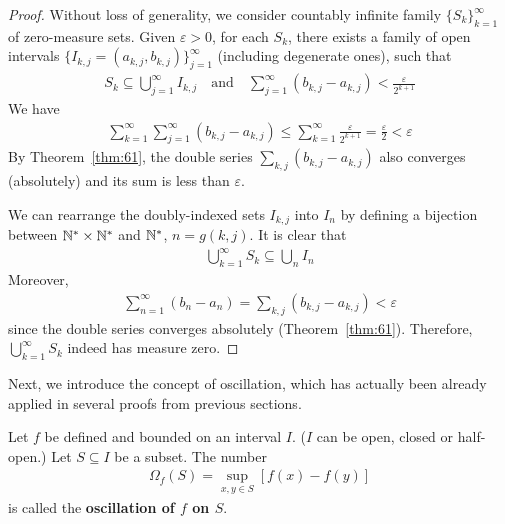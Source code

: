 \documentclass[thmcnt=section, 12pt]{my-elegantbook}
\begin{document}
\begin{proof}
    Without loss of generality,
    we consider countably infinite family
    $\{S_k\}_{k=1}^\infty$
    of zero-measure sets.
    Given $\varepsilon > 0$,
    for each $S_k$,
    there exists a family of open intervals
    $\{I_{k,j} = (a_{k,j}, b_{k,j})\}_{j=1}^\infty$
    (including degenerate ones),
    such that
    \begin{align*}
        S_k \subseteq \bigcup_{j=1}^\infty I_{k,j}
        \quad \text{and} \quad
        \sum_{j=1}^\infty (b_{k,j} - a_{k,j})
        < \frac{\varepsilon}{2^{k+1}}
    \end{align*}
    We have
    \begin{align*}
        \sum_{k=1}^\infty \sum_{j=1}^\infty
        (b_{k,j} - a_{k,j})
        \leq \sum_{k=1}^\infty \frac{\varepsilon}{2^{k+1}}
        = \frac{\varepsilon}{2}
        < \varepsilon
    \end{align*}
    By Theorem~\ref{thm:61},
    the double series $\sum_{k,j} (b_{k,j} - a_{k,j})$
    also converges (absolutely) and its sum is less than $\varepsilon$.

    We can rearrange the doubly-indexed sets $I_{k,j}$ into
    $I_n$ by defining a bijection between $\mathbb{N}^\ast \times \mathbb{N}^\ast$
    and $\mathbb{N}^\ast$, $n = g(k,j)$.
    It is clear that
    \begin{align*}
        \bigcup_{k=1}^\infty S_k
        \subseteq \bigcup_{n} I_{n}
    \end{align*}
    Moreover,
    \begin{align*}
        \sum_{n=1}^\infty (b_n - a_n)
        = \sum_{k,j} (b_{k,j} - a_{k,j})
        < \varepsilon
    \end{align*}
    since the double series converges absolutely (Theorem~\ref{thm:61}).
    Therefore, $\bigcup_{k=1}^\infty S_k$ indeed has measure zero.
\end{proof}


Next, we introduce the concept of oscillation,
which has actually been already applied
in several proofs from previous sections.

\begin{definition} \label{def:7}
    Let $f$ be defined and bounded on an interval $I$.
    ($I$ can be open, closed or half-open.)
    Let $S \subseteq I$ be a subset.
    The number
    \begin{align*}
        \Omega_f (S)
        = \sup_{x,y \in S} [f(x) - f(y)]
    \end{align*}
    is called the \textbf{oscillation of $f$ on $S$}.
\end{definition}
\end{document}
